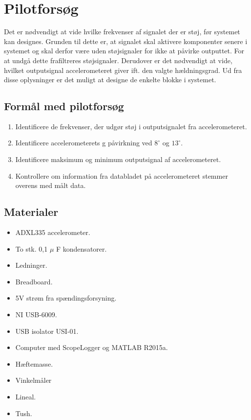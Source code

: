 \section{Pilotforsøg}
Det er nødvendigt at vide hvilke frekvenser af signalet der er støj, før systemet kan designes. Grunden til dette er, at signalet skal aktivere komponenter senere i systemet og skal derfor være uden støjsignaler for ikke at påvirke outputtet. For at undgå dette frafiltreres støjsignaler. Derudover er det nødvendigt at vide, hvilket outputsignal accelerometeret giver ift. den valgte hældningsgrad. Ud fra disse oplysninger er det muligt at designe de enkelte blokke i systemet.%

\subsection{Formål med pilotforsøg}
\begin{enumerate}
\item Identificere de frekvenser, der udgør støj i outputsignalet fra accelerometeret.
\item Identificere accelerometerets g påvirkning ved $8^{\circ}$ og $13^{\circ}$.
\item Identificere maksimum og minimum outputsignal af accelerometeret.
\item Kontrollere om information fra databladet på accelerometeret stemmer overens med målt data.
\end{enumerate}

\subsection{Materialer}
\begin{itemize}
\item ADXL335 accelerometer.
\item To stk. 0,1 $\mu$ F kondensatorer.
\item Ledninger.
\item Breadboard.
\item 5V strøm fra spændingsforsyning.
\item NI USB-6009.
\item USB isolator USI-01.
\item Computer med ScopeLogger og MATLAB R2015a.
\item Hæftemasse.
\item Vinkelmåler
\item Lineal.
\item Tush.
\end{itemize}

